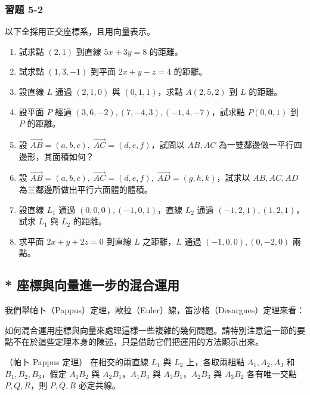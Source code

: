 \subsubsection*{習題 5-2}
以下全採用正交座標系，且用向量表示。
\begin{enumerate}[leftmargin=2em]
  \item 試求點 $(2, 1)$ 到直線 $5x + 3y = 8$ 的距離。
  \item 試求點 $(1, 3, -1)$ 到平面 $2x + y - z = 4$ 的距離。
  \item 設直線 $L$ 通過 $(2, 1, 0)$ 與 $(0, 1, 1)$，求點 $A(2, 5, 2)$ 到 $L$ 的距離。
  \item 設平面 $P$ 經過 $(3, 6, -2), (7, -4, 3), (-1, 4, -7)$，試求點 $P(0, 0, 1)$ 到 $P$ 的距離。
  \item 設 $\vec{AB} = (a, b, c),\; \vec{AC} = (d, e, f)$，試問以 $AB, AC$ 為一雙鄰邊做一平行四邊形，其面積如何？
  \item 設 $\vec{AB} = (a, b, c),\; \vec{AC} = (d, e, f),\; \vec{AD} = (g, h, k)$，試求以 $AB, AC, AD$ 為三鄰邊所做出平行六面體的體積。
  \item 設直線 $L_1$ 通過 $(0, 0, 0), (-1, 0, 1)$，直線 $L_2$ 通過 $(-1, 2, 1), (1, 2, 1)$，試求 $L_1$ 與 $L_2$ 的距離。
  \item 求平面 $2x + y + 2z = 0$ 到直線 $L$ 之距離，$L$ 通過 $(-1, 0, 0), (0, -2, 0)$ 兩點。
\end{enumerate}

\subsection{* 座標與向量進一步的混合運用}\label{sec:b3-5-3}

我們舉帕卜（Pappus）定理，歐拉（Euler）線，笛沙格（Desargues）定理來看：

如何混合運用座標與向量來處理這樣一些複雜的幾何問題。請特別注意這一節的要點不在於這些定理本身的陳述，只是借助它們把運用的方法顯示出來。

\begin{example}[論例 4]（帕卜 Pappus 定理）
在相交的兩直線 $L_1$ 與 $L_2$ 上，各取兩組點 $A_1, A_2, A_3$ 和 $B_1, B_2, B_3$，假定 $A_1B_2$ 與 $A_2B_1$，$A_1B_3$ 與 $A_3B_1$，$A_2B_3$ 與 $A_3B_2$ 各有唯一交點 $P, Q, R$，則 $P, Q, R$ 必定共線。
\end{example}

